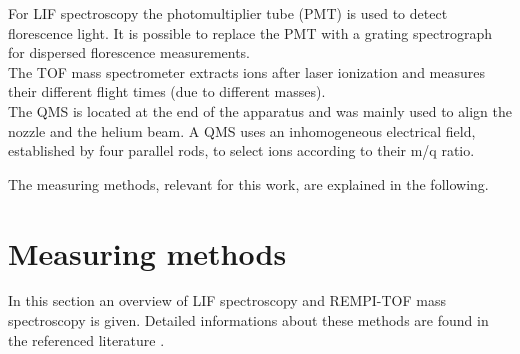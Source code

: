 \documentclass[parskip,12pt,headsepline,a4paper] {scrbook}
\begin{document}
For LIF spectroscopy the photomultiplier tube (PMT) is used to detect florescence light. It is possible to replace the PMT with a grating spectrograph for dispersed florescence measurements. \\
The TOF mass spectrometer extracts ions after laser ionization and measures their different flight times (due to different masses). \\
The QMS is located at the end of the apparatus and was mainly used to align the nozzle and the helium beam. A QMS uses an inhomogeneous electrical field, established by four parallel rods, to select ions according to their m/q ratio.

The measuring methods, relevant for this work, are explained in the following.
\newpage
\section{Measuring methods}
\label{chap:methods}
\vspace{-1\baselineskip}
In this section an overview of LIF spectroscopy and REMPI-TOF mass spectroscopy is given. Detailed informations about these methods are found in the referenced literature \cite{demtr-laser} \cite{lackner} \cite{lackner-doc}.
\end{document}

